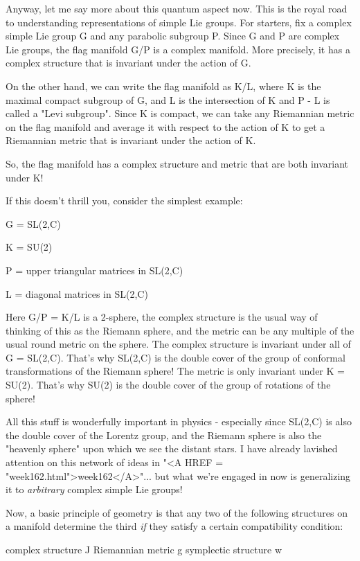Anyway, let me say more about this quantum aspect now.  This is the
royal road to understanding representations of simple Lie groups.  For
starters, fix a complex simple Lie group G and any parabolic subgroup
P.  Since G and P are complex Lie groups, the flag manifold G/P is a
complex manifold.  More precisely, it has a complex structure that is
invariant under the action of G.

On the other hand, we can write the flag manifold as K/L, where K is the
maximal compact subgroup of G, and L is the intersection of K and P -
L is called a "Levi subgroup".  Since K is compact, we can take any
Riemannian metric on the flag manifold and average it with respect to 
the action of K to get a Riemannian metric that is invariant under the
action of K.

So, the flag manifold has a complex structure and metric that are both
invariant under K!

If this doesn't thrill you, consider the simplest example:

G = SL(2,C)

K = SU(2)

P = {upper triangular matrices in SL(2,C)}

L = {diagonal matrices in SL(2,C)}

Here G/P = K/L is a 2-sphere, the complex structure is the usual way of
thinking of this as the Riemann sphere, and the metric can be any
multiple of the usual round metric on the sphere.  The complex structure
is invariant under all of G = SL(2,C).  That's why SL(2,C) is the double
cover of the group of conformal transformations of the Riemann sphere!
The metric is only invariant under K = SU(2).  That's why SU(2) is the
double cover of the group of rotations of the sphere!

All this stuff is wonderfully important in physics - especially since
SL(2,C) is also the double cover of the Lorentz group, and the Riemann
sphere is also the "heavenly sphere" upon which we see the distant
stars.  I have already lavished attention on this network of ideas 
in "<A HREF = "week162.html">week162</A>"... but what we're engaged in now is generalizing it to
\emph{arbitrary} complex simple Lie groups! 

Now, a basic principle of geometry is that any two of the following
structures on a manifold determine the third \emph{if} they satisfy a
certain compatibility condition:

complex structure J
Riemannian metric g                  
symplectic structure w

